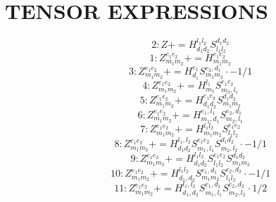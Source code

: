 \documentclass[letterpaper,10pt,fleqn,leqno,onecolumn]{article}
\begin{document}
\section{TENSOR EXPRESSIONS}
\begin{equation} \;\;\;\;\;\;  2: Z+=H^{l_{1}l_{2}}_{d_{1}d_{2}}S^{d_{1}d_{2}}_{l_{1}l_{2}} \end{equation}
\begin{equation} \;\;\;\;\;\;  1: Z^{e_{1}e_{2}}_{m_{1}m_{2}}+=H^{e_{1}e_{2}}_{m_{1}m_{2}} \end{equation}
\begin{equation} \;\;\;\;\;\;  3: Z^{e_{1}e_{2}}_{m_{1}m_{2}}+=H^{e_{1}}_{d_{1}}S^{e_{2},d_{1}}_{m_{1}m_{2}}\cdot -1/1 \end{equation}
\begin{equation} \;\;\;\;\;\;  4: Z^{e_{1}e_{2}}_{m_{1}m_{2}}+=H^{l_{1}}_{m_{1}}S^{e_{1}e_{2}}_{m_{2},l_{1}} \end{equation}
\begin{equation} \;\;\;\;\;\;  5: Z^{e_{1}e_{2}}_{m_{1}m_{2}}+=H^{e_{1}e_{2}}_{d_{1}d_{2}}S^{d_{1}d_{2}}_{m_{1}m_{2}} \end{equation}
\begin{equation} \;\;\;\;\;\;  6: Z^{e_{1}e_{2}}_{m_{1}m_{2}}+=H^{e_{1},l_{1}}_{m_{1},d_{1}}S^{e_{2},d_{1}}_{m_{2},l_{1}} \end{equation}
\begin{equation} \;\;\;\;\;\;  7: Z^{e_{1}e_{2}}_{m_{1}m_{2}}+=H^{l_{1}l_{2}}_{m_{1}m_{2}}S^{e_{1}e_{2}}_{l_{1}l_{2}} \end{equation}
\begin{equation} \;\;\;\;\;\;  8: Z^{e_{1}e_{2}}_{m_{1}m_{2}}+=H^{l_{1},l_{2}}_{d_{1}d_{2}}S^{e_{1}e_{2}}_{m_{1},l_{1}}S^{d_{1}d_{2}}_{m_{2},l_{2}}\cdot -1/1 \end{equation}
\begin{equation} \;\;\;\;\;\;  9: Z^{e_{1}e_{2}}_{m_{1}m_{2}}+=H^{l_{1}l_{2}}_{d_{1}d_{2}}S^{e_{1}e_{2}}_{l_{1}l_{2}}S^{d_{1}d_{2}}_{m_{1}m_{2}} \end{equation}
\begin{equation} \;\;\;\;\;\;  10: Z^{e_{1}e_{2}}_{m_{1}m_{2}}+=H^{l_{1}l_{2}}_{d_{1},d_{2}}S^{e_{1},d_{1}}_{m_{1}m_{2}}S^{e_{2},d_{2}}_{l_{1}l_{2}}\cdot -1/1 \end{equation}
\begin{equation} \;\;\;\;\;\;  11: Z^{e_{1}e_{2}}_{m_{1}m_{2}}+=H^{l_{1},l_{2}}_{d_{1},d_{2}}S^{e_{1},d_{1}}_{m_{1},l_{1}}S^{e_{2},d_{2}}_{m_{2},l_{2}}\cdot 1/2 \end{equation}
\end{document}
